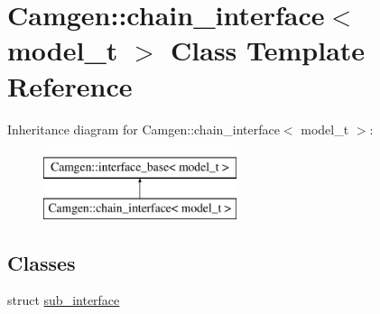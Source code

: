 \hypertarget{a00060}{}\section{Camgen\+:\+:chain\+\_\+interface$<$ model\+\_\+t $>$ Class Template Reference}
\label{a00060}
Inheritance diagram for Camgen\+:\+:chain\+\_\+interface$<$ model\+\_\+t $>$\+:\begin{figure}[H]
\begin{center}
\leavevmode
\includegraphics[height=2.000000cm]{a00060}
\end{center}
\end{figure}
\subsection*{Classes}
\begin{DoxyCompactItemize}
\item 
struct \hyperlink{a00525}{sub\+\_\+interface}
\end{DoxyCompactItemize}
